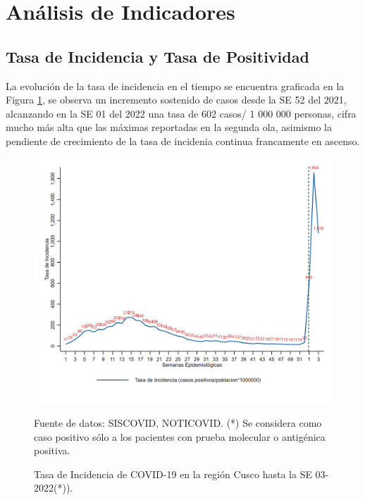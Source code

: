 \documentclass[12pt,a4paper,openany]{book}
\begin{document}

\clearpage

    \section*{Análisis de Indicadores}
   	\subsection*{Tasa de Incidencia y Tasa de Positividad}
\noindent La evolución de la tasa de incidencia en el tiempo se encuentra graficada en la Figura \ref{fig:incidencia}, se observa un incremento sostenido de casos desde la SE 52 del 2021, alcanzando en la SE 01 del 2022 una tasa de 602 casos/ 1 000 000 personas, cifra mucho más alta que las máximas reportadas en la segunda ola, asimismo la pendiente de crecimiento de la tasa de incidenia continua francamente en ascenso. 

  \begin{figure}[h]
  	\caption{Tasa de Incidencia de COVID-19 en la región Cusco hasta la SE 03-2022(*)). }\label{fig:incidencia}
  	\begin{center}
  		\includegraphics[width=0.85\linewidth]{../figuras/tasa_incidencia__2021_2022.png}
  	\end{center}
  	{\footnotesize {Fuente de datos: SISCOVID, NOTICOVID. (*) Se considera como caso positivo sólo a los pacientes con prueba molecular o antigénica positiva.}}
  \end{figure}
   
\end{document}
